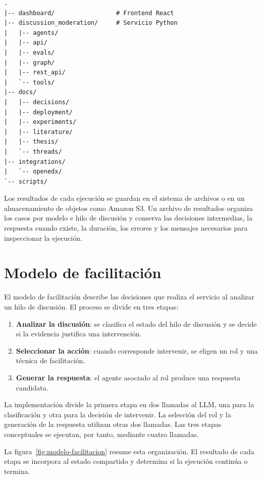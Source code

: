 \begin{samepage}
\begin{small}
\begin{verbatim}
.
|-- dashboard/                 # Frontend React
|-- discussion_moderation/     # Servicio Python
|   |-- agents/
|   |-- api/
|   |-- evals/
|   |-- graph/
|   |-- rest_api/
|   `-- tools/
|-- docs/
|   |-- decisions/
|   |-- deployment/
|   |-- experiments/
|   |-- literature/
|   |-- thesis/
|   `-- threads/
|-- integrations/
|   `-- openedx/
`-- scripts/
\end{verbatim}
\end{small}
\end{samepage}

Los resultados de cada ejecución se guardan en el sistema de archivos o en un almacenamiento de objetos como Amazon S3. Un archivo de resultados organiza los casos por modelo e hilo de discusión y conserva las decisiones intermedias, la respuesta cuando existe, la duración, los errores y los mensajes necesarios para inspeccionar la ejecución.

\section{Modelo de facilitación}
\label{sec:modelo-facilitacion}

El modelo de facilitación describe las decisiones que realiza el servicio al analizar un hilo de discusión. El proceso se divide en tres etapas:

\begin{enumerate}
  \item \textbf{Analizar la discusión}: se clasifica el estado del hilo de discusión y se decide si la evidencia justifica una intervención.
  \item \textbf{Seleccionar la acción}: cuando corresponde intervenir, se eligen un rol y una técnica de facilitación.
  \item \textbf{Generar la respuesta}: el agente asociado al rol produce una respuesta candidata.
\end{enumerate}

La implementación divide la primera etapa en dos llamadas al LLM, una para la clasificación y otra para la decisión de intervenir. La selección del rol y la generación de la respuesta utilizan otras dos llamadas. Las tres etapas conceptuales se ejecutan, por tanto, mediante cuatro llamadas.

La figura~\ref{fig:modelo-facilitacion} resume esta organización. El resultado de cada etapa se incorpora al estado compartido y determina si la ejecución continúa o termina.

